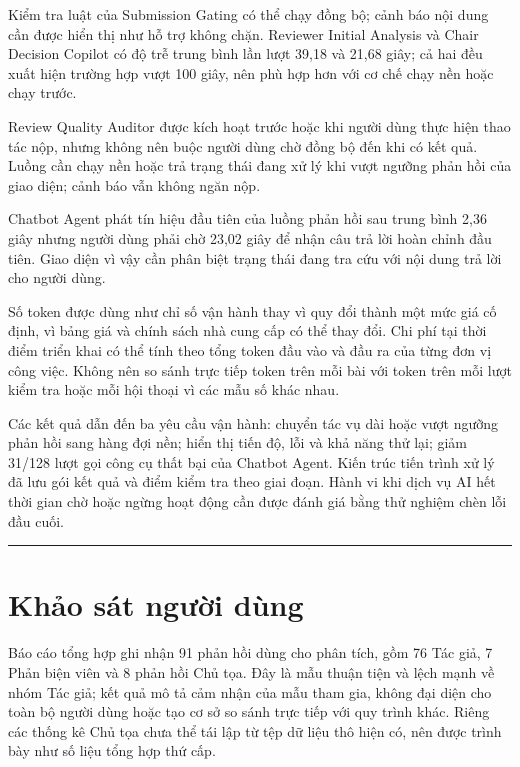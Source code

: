 Kiểm tra luật của Submission Gating có thể chạy đồng bộ; cảnh báo nội dung cần được hiển thị như hỗ trợ không chặn. Reviewer Initial Analysis và Chair Decision Copilot có độ trễ trung bình lần lượt 39,18 và 21,68 giây; cả hai đều xuất hiện trường hợp vượt 100 giây, nên phù hợp hơn với cơ chế chạy nền hoặc chạy trước.

Review Quality Auditor được kích hoạt trước hoặc khi người dùng thực hiện thao tác nộp, nhưng không nên buộc người dùng chờ đồng bộ đến khi có kết quả. Luồng cần chạy nền hoặc trả trạng thái đang xử lý khi vượt ngưỡng phản hồi của giao diện; cảnh báo  vẫn không ngăn nộp.

Chatbot Agent phát tín hiệu đầu tiên của luồng phản hồi sau trung bình 2,36 giây nhưng người dùng phải chờ 23,02 giây để nhận câu trả lời hoàn chỉnh đầu tiên. Giao diện vì vậy cần phân biệt trạng thái đang tra cứu với nội dung trả lời cho người dùng.

Số token được dùng như chỉ số vận hành thay vì quy đổi thành một mức giá cố định, vì bảng giá và chính sách nhà cung cấp có thể thay đổi. Chi phí tại thời điểm triển khai có thể tính theo tổng token đầu vào và đầu ra của từng đơn vị công việc. Không nên so sánh trực tiếp token trên mỗi bài với token trên mỗi lượt kiểm tra hoặc mỗi hội thoại vì các mẫu số khác nhau.

Các kết quả dẫn đến ba yêu cầu vận hành: chuyển tác vụ dài hoặc vượt ngưỡng phản hồi sang hàng đợi nền; hiển thị tiến độ, lỗi và khả năng thử lại; giảm 31/128 lượt gọi công cụ thất bại của Chatbot Agent. Kiến trúc tiến trình xử lý đã lưu gói kết quả và điểm kiểm tra theo giai đoạn. Hành vi khi dịch vụ AI hết thời gian chờ hoặc ngừng hoạt động cần được đánh giá bằng thử nghiệm chèn lỗi đầu cuối.

\par\noindent\rule{\textwidth}{0.4pt}\par

\section{Khảo sát người dùng}

Báo cáo tổng hợp ghi nhận 91 phản hồi dùng cho phân tích, gồm 76 Tác giả, 7 Phản biện viên và 8 phản hồi Chủ tọa. Đây là mẫu thuận tiện và lệch mạnh về nhóm Tác giả; kết quả mô tả cảm nhận của mẫu tham gia, không đại diện cho toàn bộ người dùng hoặc tạo cơ sở so sánh trực tiếp với quy trình khác. Riêng các thống kê Chủ tọa chưa thể tái lập từ tệp dữ liệu thô hiện có, nên được trình bày như số liệu tổng hợp thứ cấp.

